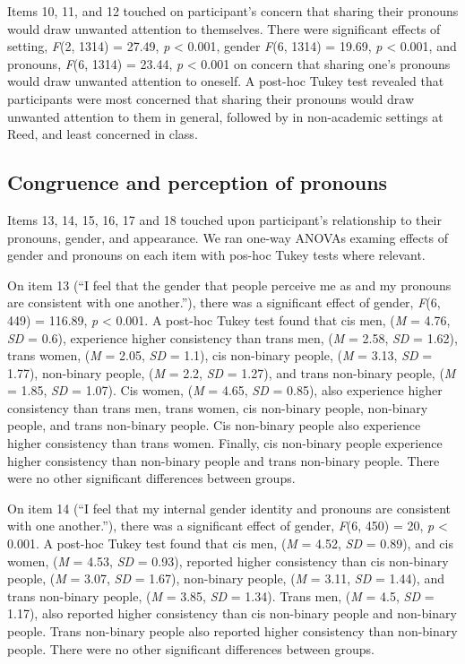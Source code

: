 \documentclass[12pt,twoside]{reedthesis}
\begin{document}
Items 10, 11, and 12 touched on participant's concern that sharing their pronouns would draw unwanted attention to themselves. There were significant effects of setting, \emph{F}(2, 1314) = 27.49, \emph{p} \textless{} 0.001, gender \emph{F}(6, 1314) = 19.69, \emph{p} \textless{} 0.001, and pronouns, \emph{F}(6, 1314) = 23.44, \emph{p} \textless{} 0.001 on concern that sharing one's pronouns would draw unwanted attention to oneself. A post-hoc Tukey test revealed that participants were most concerned that sharing their pronouns would draw unwanted attention to them in general, followed by in non-academic settings at Reed, and least concerned in class.

\hypertarget{congruence-and-perception-of-pronouns}{%
\subsection{Congruence and perception of pronouns}\label{congruence-and-perception-of-pronouns}}

Items 13, 14, 15, 16, 17 and 18 touched upon participant's relationship to their pronouns, gender, and appearance. We ran one-way ANOVAs examing effects of gender and pronouns on each item with pos-hoc Tukey tests where relevant.

On item 13 (``I feel that the gender that people perceive me as and my pronouns are consistent with one another.''), there was a significant effect of gender, \emph{F}(6, 449) = 116.89, \emph{p} \textless{} 0.001. A post-hoc Tukey test found that cis men, (\emph{M} = 4.76, \emph{SD} = 0.6), experience higher consistency than trans men, (\emph{M} = 2.58, \emph{SD} = 1.62), trans women, (\emph{M} = 2.05, \emph{SD} = 1.1), cis non-binary people, (\emph{M} = 3.13, \emph{SD} = 1.77), non-binary people, (\emph{M} = 2.2, \emph{SD} = 1.27), and trans non-binary people, (\emph{M} = 1.85, \emph{SD} = 1.07). Cis women, (\emph{M} = 4.65, \emph{SD} = 0.85), also experience higher consistency than trans men, trans women, cis non-binary people, non-binary people, and trans non-binary people. Cis non-binary people also experience higher consistency than trans women. Finally, cis non-binary people experience higher consistency than non-binary people and trans non-binary people. There were no other significant differences between groups.

On item 14 (``I feel that my internal gender identity and pronouns are consistent with one another.''), there was a significant effect of gender, \emph{F}(6, 450) = 20, \emph{p} \textless{} 0.001. A post-hoc Tukey test found that cis men, (\emph{M} = 4.52, \emph{SD} = 0.89), and cis women, (\emph{M} = 4.53, \emph{SD} = 0.93), reported higher consistency than cis non-binary people, (\emph{M} = 3.07, \emph{SD} = 1.67), non-binary people, (\emph{M} = 3.11, \emph{SD} = 1.44), and trans non-binary people, (\emph{M} = 3.85, \emph{SD} = 1.34). Trans men, (\emph{M} = 4.5, \emph{SD} = 1.17), also reported higher consistency than cis non-binary people and non-binary people. Trans non-binary people also reported higher consistency than non-binary people. There were no other significant differences between groups.
\end{document}
